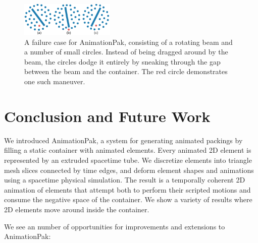 \begin{figure}[t]
\centering
\includegraphics[width=0.4\textwidth]{figures/animationpak/blender.pdf} 
\caption[A failure case for AnimationPak]
{\label{fig_animationpak_blender} 
A failure case for AnimationPak, consisting of 
a rotating beam and a number of small circles.  Instead of being dragged
around by the beam, the circles dodge it entirely by sneaking through
the gap between the beam and the container.
The red circle demonstrates one such maneuver.
}
\end{figure}


\section{Conclusion and Future Work}
\label{animationpak_conclusion_and_future_work}

We introduced AnimationPak, a system for 
generating animated packings by filling a static container with animated
elements.  Every animated 2D element is represented by an extruded 
spacetime tube.
We discretize elements into triangle mesh slices connected by time edges,
and deform element shapes and animations using a spacetime physical
simulation.  The result is a temporally coherent 2D animation of elements
that attempt both to perform their scripted motions and consume the negative
space of the container.
We show a variety of results where
2D elements move around inside the container.

We see an number of opportunities for improvements and extensions to
AnimationPak:

